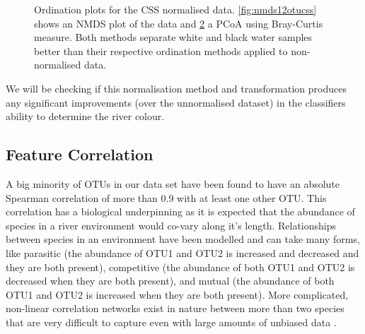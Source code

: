 \begin{figure}[h]
\begin{subfigure}{0.4\textwidth}
		\caption{}
		\label{fig:pcoa12otucss}
	\end{subfigure}
	\caption{Ordination plots for the CSS normalised data. \ref{fig:nmds12otucss} shows an NMDS plot of the data and \ref{fig:pcoa12otucss} a PCoA using Bray-Curtis measure. Both methods separate white and black water samples better than their respective ordination methods applied to non-normalised data.}
\end{figure}

We will be checking if this normalisation method and transformation produces any significant improvements (over the unnormalised dataset) in the classifiers ability to determine the river colour. 



\subsection{Feature Correlation}

A big minority of OTUs in our data set have been found to have an absolute Spearman correlation of more than 0.9 with at least one other OTU. This correlation has a biological underpinning as it is expected that the abundance of species in a river environment would co-vary along it's length. Relationships between species in an environment have been modelled and can take many forms, like parasitic (the abundance of OTU1 and OTU2 is increased and decreased and they are both present), competitive (the abundance of both OTU1 and OTU2 is decreased when they are both present), and mutual (the abundance of both OTU1 and OTU2 is increased when they are both present). More complicated, non-linear correlation networks exist in nature between more than two species that are very difficult to capture even with large amounts of unbiased data \cite{weiss_correlation_2016}. 



